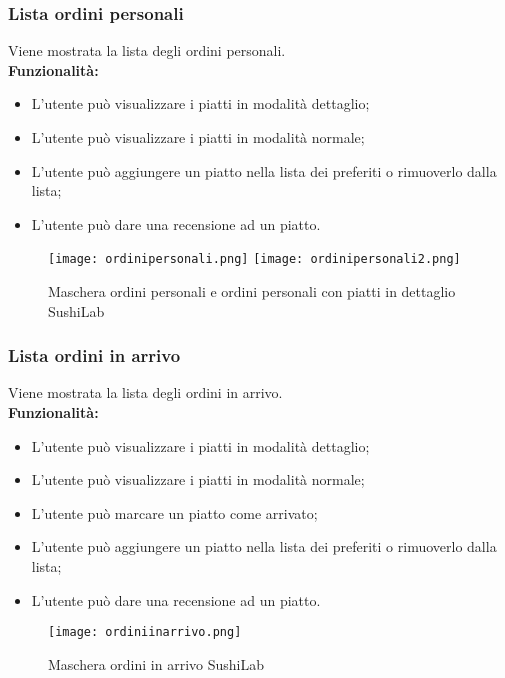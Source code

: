 \subsubsection{Lista ordini personali}
Viene mostrata la lista degli ordini personali.\\
\textbf{Funzionalità:}
\begin{itemize}
    \item L'utente può visualizzare i piatti in modalità dettaglio;
    \item L'utente può visualizzare i piatti in modalità normale;
    \item L'utente può aggiungere un piatto nella lista dei preferiti o rimuoverlo dalla lista;
    \item L'utente può dare una recensione ad un piatto.
\end{itemize}
\begin{figure}[H]
    \centering
    \texttt{[image: ordinipersonali.png]}
    \texttt{[image: ordinipersonali2.png]}
    \caption{Maschera ordini personali e ordini personali con piatti in dettaglio SushiLab}
\end{figure}
\pagebreak

\subsubsection{Lista ordini in arrivo}
Viene mostrata la lista degli ordini in arrivo.\\
\textbf{Funzionalità:}
\begin{itemize}
    \item L'utente può visualizzare i piatti in modalità dettaglio;
    \item L'utente può visualizzare i piatti in modalità normale;
    \item L'utente può marcare un piatto come arrivato;
    \item L'utente può aggiungere un piatto nella lista dei preferiti o rimuoverlo dalla lista;
    \item L'utente può dare una recensione ad un piatto.
\end{itemize}
\begin{figure}[H]
    \centering
    \texttt{[image: ordiniinarrivo.png]}
    \caption{Maschera ordini in arrivo SushiLab}
\end{figure}
\pagebreak

